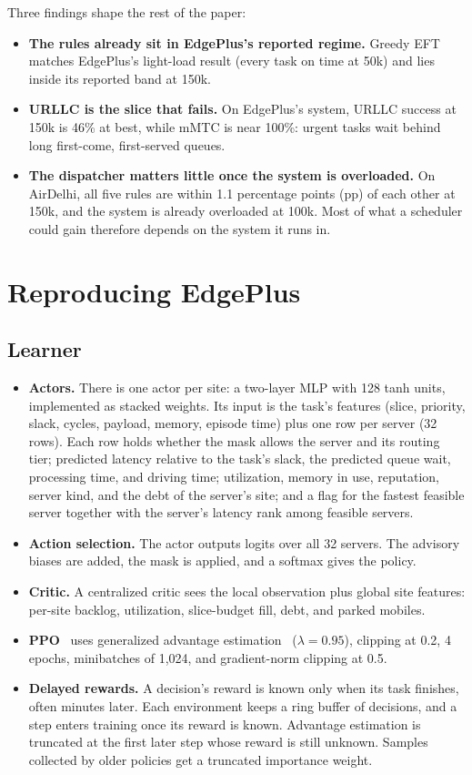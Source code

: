 \documentclass[11pt,journal,onecolumn]{IEEEtran}
\begin{document}
Three findings shape the rest of the paper:
\begin{itemize}
\item \textbf{The rules already sit in EdgePlus's reported regime.} Greedy EFT matches EdgePlus's light-load result (every task on time at 50k) and lies inside its reported band at 150k.
\item \textbf{URLLC is the slice that fails.} On EdgePlus's system, URLLC success at 150k is 46\% at best, while mMTC is near 100\%: urgent tasks wait behind long first-come, first-served queues.
\item \textbf{The dispatcher matters little once the system is overloaded.} On AirDelhi, all five rules are within 1.1 percentage points (pp) of each other at 150k, and the system is already overloaded at 100k. Most of what a scheduler could gain therefore depends on the system it runs in.
\end{itemize}

\section{Reproducing EdgePlus}
\label{sec:repro}

\subsection{Learner}
\begin{itemize}
\item \textbf{Actors.} There is one actor per site: a two-layer MLP with 128 tanh units, implemented as stacked weights. Its input is the task's features (slice, priority, slack, cycles, payload, memory, episode time) plus one row per server (32 rows). Each row holds whether the mask allows the server and its routing tier; predicted latency relative to the task's slack, the predicted queue wait, processing time, and driving time; utilization, memory in use, reputation, server kind, and the debt of the server's site; and a flag for the fastest feasible server together with the server's latency rank among feasible servers.
\item \textbf{Action selection.} The actor outputs logits over all 32 servers. The advisory biases are added, the mask is applied, and a softmax gives the policy.
\item \textbf{Critic.} A centralized critic sees the local observation plus global site features: per-site backlog, utilization, slice-budget fill, debt, and parked mobiles.
\item \textbf{PPO}~\cite{ppo} uses generalized advantage estimation~\cite{gae} ($\lambda = 0.95$), clipping at 0.2, 4 epochs, minibatches of 1,024, and gradient-norm clipping at 0.5.
\item \textbf{Delayed rewards.} A decision's reward is known only when its task finishes, often minutes later. Each environment keeps a ring buffer of decisions, and a step enters training once its reward is known. Advantage estimation is truncated at the first later step whose reward is still unknown. Samples collected by older policies get a truncated importance weight.
\end{itemize}
\end{document}
